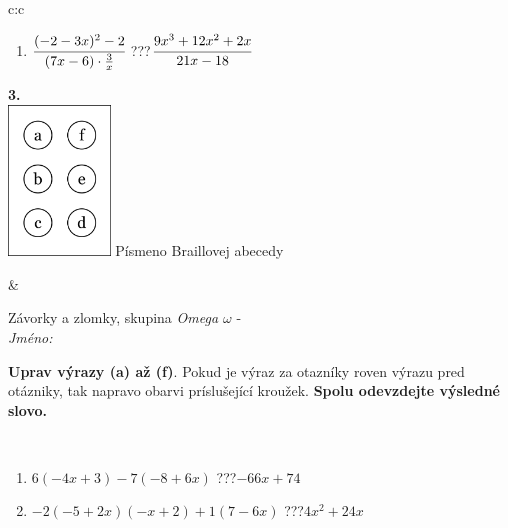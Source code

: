 \documentclass[10pt]{report}
\begin{document}
\begin{tabular}{c:c}
\begin{minipage}[c][104.5mm][t]{0.5\linewidth}
\begin{center}
\begin{minipage}{0.79\linewidth}
\begin{center}
\begin{varwidth}{\linewidth}
\begin{enumerate}
\item $\cfrac{(-2-3x)^2-2}{(7x-6)\cdot\frac{3}{x}}$\quad \dotfill\; ???\;\dotfill \quad $\cfrac{9x^3+12x^2+2x}{21x-18}$
\end{enumerate}
\end{varwidth}
\end{center}
\end{minipage}
\begin{minipage}{0.20\linewidth}
\begin{center}
{\Huge\bfseries 3.} \\[2mm]
\includegraphics[height=40mm]{../images/braille.png}
{\small Písmeno Braillovej abecedy}
\end{center}
\end{minipage}
\end{center}
\end{minipage}
&
\begin{minipage}[c][104.5mm][t]{0.5\linewidth}
\begin{center}
\vspace{7mm}
{\huge Závorky a zlomky, skupina \textit{Omega $\omega$} -}\\[5mm]
\textit{Jméno:}\phantom{xxxxxxxxxxxxxxxxxxxxxxxxxxxxxxxxxxxxxxxxxxxxxxxxxxxxxxxxxxxxxxxxx}\\[5mm]
\begin{minipage}{0.95\linewidth}
\begin{center}
\textbf{Uprav výrazy (a) až (f)}. Pokud je výraz za otazníky roven výrazu pred otázniky, tak napravo obarvi príslušející kroužek. \textbf{Spolu odevzdejte výsledné slovo.}
\end{center}
\end{minipage}
\\[1mm]
\begin{minipage}{0.79\linewidth}
\begin{center}
\begin{varwidth}{\linewidth}
\begin{enumerate}
\normalsize
\item $6(-4x+3)-7(-8+6x)$\quad \dotfill\; ???\;\dotfill \quad $-66x+74$
\item $-2(-5+2x)(-x+2)+1(7-6x)$\quad \dotfill\; ???\;\dotfill \quad $4x^2+24x$

\end{enumerate}
\end{varwidth}
\end{center}
\end{minipage}
\end{center}
\end{minipage}
\end{tabular}
\end{document}
